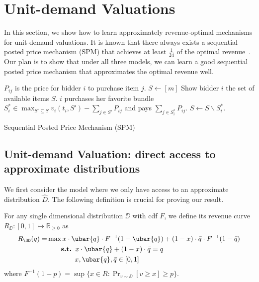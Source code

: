 \section{Unit-demand Valuations} \label{sec:unit-demand}

In this section, we show how to learn approximately revenue-optimal mechanisms for unit-demand valuations. It is known that there always exists a sequential posted price mechanism (SPM) that achieves at least $\frac{1}{24}$ of the optimal revenue~\cite{ChawlaHMS10, KleinbergW12, CaiDW16}. Our plan is to show that under all three models, we can learn a good sequential posted price mechanism that approximates the optimal revenue well.

\begin{algorithm}[ht]
\begin{algorithmic}[1]
\REQUIRE $P_{ij}$ is the price for bidder $i$ to purchase item $j$.
\STATE $S\gets [m]$
	\STATE Show bidder $i$ {the} set of available items $S$.
	 \STATE $i$ purchases her favorite bundle $S_i^{*}\in \max_{S'\subseteq S} v_i(t_i, S') - \sum_{j\in S'} P_{ij}$ and pays $\sum_{j\in S_i^{*}}P_{ij}$.
        \STATE $S\gets S\backslash S_i^{*}$.
\ENDFOR
\end{algorithmic}
\caption{{\sf Sequential Posted Price Mechanism (SPM)}}
\label{alg:seq-mech}
\end{algorithm} 

\subsection{Unit-demand Valuation: direct access to approximate distributions}\label{sec:unit-demand Kolmogorov}
We first consider the model where we only have access to an approximate distribution $\hat{D}$. The following definition is crucial for proving our result. 

\begin{definition}
For any single dimensional distribution $\DD$ with cdf $F$, we define its revenue curve $R_{\DD}: [0,1]\mapsto \mathbb{R}_{\geq 0}$ as
	\begin{align*}
	{R}_{\DD} (q) = &\max  x\cdot \ubar{q}\cdot {F}^{-1}(1-\ubar{q}) +(1-x)\cdot \bar{q}\cdot {F}^{-1}(1-\bar{q})\\
	& \qquad\textbf{s.t. } x\cdot \ubar{q}+(1-x)\cdot \bar{q}=q\\
	&  \qquad\qquad x, \ubar{q}, \bar{q} \in [0,1]
\end{align*}
where $F^{-1}(1-p) = \sup\{x\in R: \Pr_{v\sim \DD}[v\geq x]\geq p\}$.
\end{definition}



